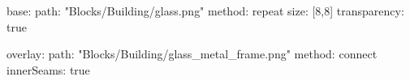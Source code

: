 base:
  path: "Blocks/Building/glass.png"
  method: repeat
  size: [8,8]
  transparency: true

overlay:
  path: "Blocks/Building/glass_metal_frame.png"
  method: connect
  innerSeams: true
